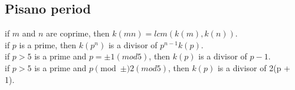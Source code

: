     \subsection{Pisano period}
        if $m$ and $n$ are coprime, then $k(mn) = lcm(k(m), k(n))$. \\
        if $p$ is a prime, then $k(p^n)$ is a divisor of $p^{n - 1} k(p)$. \\
        if $p > 5$ is a prime and $p = \pm 1 (mod 5)$, then $k(p)$ is a divisor of $p - 1$. \\
        if $p > 5$ is a prime and $p \pmod \pm 2 (mod 5)$, then $k(p)$ is a divisor of 2(p + 1).

